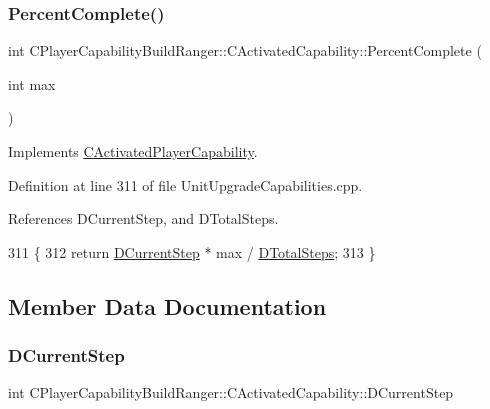 \subsubsection{\texorpdfstring{Percent\+Complete()}{PercentComplete()}}
{\footnotesize\ttfamily int C\+Player\+Capability\+Build\+Ranger\+::\+C\+Activated\+Capability\+::\+Percent\+Complete (\begin{DoxyParamCaption}\item[{int}]{max }\end{DoxyParamCaption})\hspace{0.3cm}{\ttfamily [virtual]}}



Implements \hyperlink{classCActivatedPlayerCapability_a405dc6076058006a4f801727de4cfe4d}{C\+Activated\+Player\+Capability}.



Definition at line 311 of file Unit\+Upgrade\+Capabilities.\+cpp.



References D\+Current\+Step, and D\+Total\+Steps.


\begin{DoxyCode}
311                                                                             \{
312     \textcolor{keywordflow}{return} \hyperlink{classCPlayerCapabilityBuildRanger_1_1CActivatedCapability_a27be6f32606ef0dcc31ec42e0504611c}{DCurrentStep} * max / \hyperlink{classCPlayerCapabilityBuildRanger_1_1CActivatedCapability_a322dd429ae588ed82febdcf459232bee}{DTotalSteps};
313 \}
\end{DoxyCode}


\subsection{Member Data Documentation}
\hypertarget{classCPlayerCapabilityBuildRanger_1_1CActivatedCapability_a27be6f32606ef0dcc31ec42e0504611c}{}\label{classCPlayerCapabilityBuildRanger_1_1CActivatedCapability_a27be6f32606ef0dcc31ec42e0504611c} 
\subsubsection{\texorpdfstring{D\+Current\+Step}{DCurrentStep}}
{\footnotesize\ttfamily int C\+Player\+Capability\+Build\+Ranger\+::\+C\+Activated\+Capability\+::\+D\+Current\+Step\hspace{0.3cm}{\ttfamily [protected]}}



